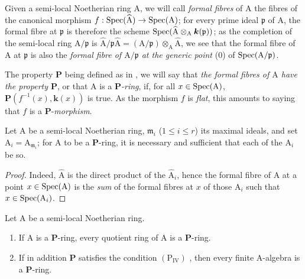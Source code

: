 \begin{env}[7.3.13]
\label{IV.7.3.13}
Given a semi-local Noetherian ring $\mathrm{A}$, we will call \emph{formal fibres} of $\mathrm{A}$ the fibres of the canonical morphism $f:\operatorname{Spec}(\widehat{\mathrm{A}})\to\operatorname{Spec}(\mathrm{A})$; for every prime ideal $\mathfrak{p}$ of $\mathrm{A}$, the formal fibre at $\mathfrak{p}$ is therefore the scheme $\operatorname{Spec}(\widehat{\mathrm{A}}\otimes_\mathrm{A}\boldsymbol{k}(\mathfrak{p}))$; as the completion of the semi-local ring $\mathrm{A}/\mathfrak{p}$ is $\widehat{\mathrm{A}}/\mathfrak{p}\widehat{\mathrm{A}}=(\mathrm{A}/\mathfrak{p})\otimes_\mathrm{A}\widehat{\mathrm{A}}$, we see that the formal fibre of $\mathrm{A}$ at $\mathfrak{p}$ is also the \emph{formal fibre of $\mathrm{A}/\mathfrak{p}$ at the generic point} \textup{(0)} of $\operatorname{Spec}(\mathrm{A}/\mathfrak{p})$.
\end{env}


The property $\boldsymbol{P}$ being defined as in , we will say that \emph{the formal fibres of $\mathrm{A}$ have the property $\boldsymbol{P}$}, or that $\mathrm{A}$ is a \emph{$\boldsymbol{P}$-ring}, if, for all $x\in\operatorname{Spec}(\mathrm{A})$, $\boldsymbol{P}(f^{-1}(x),\boldsymbol{k}(x))$ is true.
As the morphism $f$ is \emph{flat}, this amounts to saying that $f$ is a $\boldsymbol{P}$-\emph{morphism}.

\begin{proposition}[7.3.14]
\label{IV.7.3.14}
Let $\mathrm{A}$ be a semi-local Noetherian ring, $\mathfrak{m}_i$ ($1\leqslant i\leqslant r$) its maximal ideals, and set $\mathrm{A}_i=\mathrm{A}_{\mathfrak{m}_i}$; for $\mathrm{A}$ to be a $\boldsymbol{P}$-ring, it is necessary and sufficient that each of the $\mathrm{A}_i$ be so.
\end{proposition}

\begin{proof}
Indeed, $\widehat{\mathrm{A}}$ is the direct product of the $\widehat{\mathrm{A}}_i$, hence the formal fibre of $\mathrm{A}$ at a point $x\in\operatorname{Spec}(\mathrm{A})$ is the \emph{sum} of the formal fibres at $x$ of those $\mathrm{A}_i$ such that $x\in\operatorname{Spec}(\mathrm{A}_i)$.
\end{proof}

\begin{proposition}[7.3.15]
\label{IV.7.3.15}
Let $\mathrm{A}$ be a semi-local Noetherian ring.
\begin{enumerate}[label=\textup{(\roman*)}]
  \item If $\mathrm{A}$ is a $\boldsymbol{P}$-ring, every quotient ring of $\mathrm{A}$ is a $\boldsymbol{P}$-ring.
  \item If in addition $\boldsymbol{P}$ satisfies the condition $(\mathrm{P_{IV}})$ , then every finite A-algebra is a $\boldsymbol{P}$-ring.
\end{enumerate}
\end{proposition}

